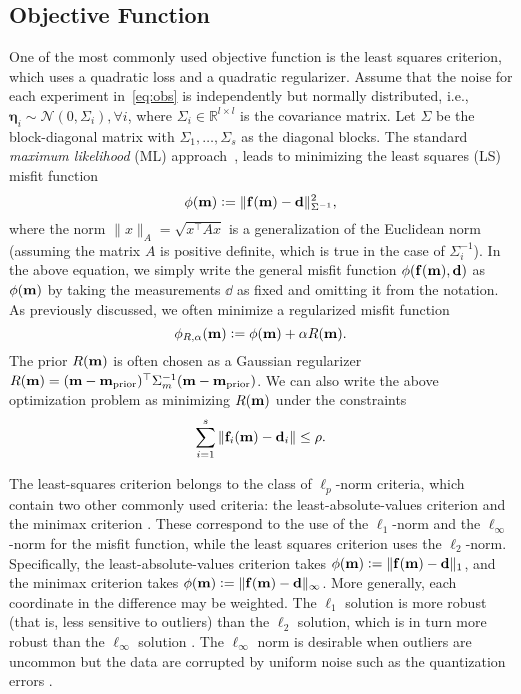 \subsection{Objective Function}
\label{sec:obj}
One of the most commonly used objective function is the least squares criterion,
which uses a quadratic loss and a quadratic regularizer.
Assume that the noise for each experiment in~\eqref{eq:obs} is independently but
normally distributed, i.e.,
$\bm{\eta}_{i} \sim \mathcal{N}(0,\Sigma_{i} ), \forall i$, where $\Sigma_{i}
\in \mathbb{R}^{l \times l}$ is the covariance matrix.
Let $\Sigma$ be the block-diagonal matrix with $\Sigma_{1}, \ldots, \Sigma_{s}$
as the diagonal blocks.
The standard \textit{maximum likelihood} (ML) approach~\cite{scharf1991statistical}, leads
to minimizing the least squares (LS) misfit function 
\begin{equation} \label{eq:l2}
	\phi({\bf m}) \mathrel{\mathop:}= \|{\bf f}({\bf m}) - {\bf d}\|_{\Sigma^{-1}}^2,
\end{equation}
where the norm $\|x\|_{A} = \sqrt{x^{\top} A x}$ is a generalization of the Euclidean
norm (assuming the matrix $A$ is positive definite, which is true in the case of
$\Sigma_{i}^{-1}$). In the above equation, we simply write the general misfit function
$\phi({\bf f}({\bf m}), {\bf d})$ as $\phi({\bf m})$ by taking the measurements $\dd$ as fixed
and omitting it from the notation.
As previously discussed, we often minimize a regularized misfit function
\begin{equation} \label{eq:reg_l2}
	\phi_{R,\alpha}({\bf m}) \mathrel{\mathop:}=  \phi({\bf m}) + \alpha R({\bf m}).
\end{equation}
The prior $R({\bf m})$ is often chosen as a Gaussian regularizer
$R({\bf m}) 
= ({\bf m} - {\bf m}_{\text{prior}})^{\top} \Sigma_{m}^{-1} ({\bf m} - {\bf m}_{\text{prior}})$.
We can also write the above optimization problem as minimizing $R({\bf m})$ under
the constraints
\begin{equation} \label{eq:objective_eq}
	\sum_{i=1}^{s} \|{\bf f}_{i}({\bf m}) - {\bf d}_{i}\| \leq \rho.
\end{equation}

The least-squares criterion belongs to the class of $\ell_p$-norm
criteria, which contain two other commonly used criteria:
the least-absolute-values criterion and the minimax criterion
\cite{tarantola2005inverse}.
These correspond to the use of the $\ell_{1}$-norm and the $\ell_{\infty}$-norm
for the misfit function, while the least squares criterion uses the
$\ell_{2}$-norm.
Specifically, the least-absolute-values criterion takes 
$\phi({\bf m}) \mathrel{\mathop:}= \|{\bf f}({\bf m}) - {\bf d}\|_1$, 
and the minimax criterion takes
$\phi({\bf m}) \mathrel{\mathop:}= \|{\bf f}({\bf m}) - {\bf d}\|_{\infty}$.
More generally, each coordinate in the difference may be weighted.
The $\ell_{1}$ solution is more robust (that is, less sensitive to outliers) than the
$\ell_{2}$ solution, which is in turn more robust than the $\ell_{\infty}$ solution
\cite{claerbout1973robust}.
The $\ell_{\infty}$ norm is desirable when outliers are uncommon but the data
are corrupted by uniform noise such as the quantization errors
\cite{clason2012fitting}.


